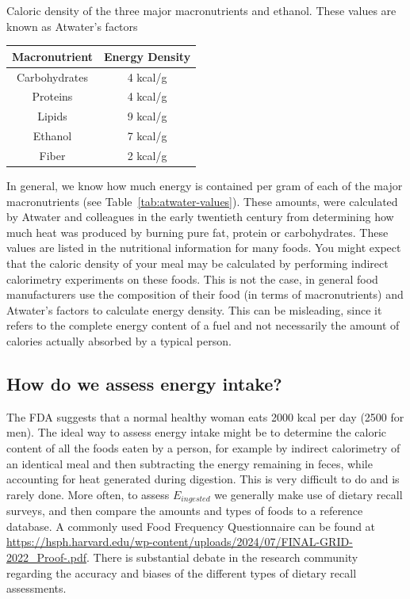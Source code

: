 \documentclass{tufte-handout}
\begin{document}
\begin{margintable}
\centering
\caption{Caloric density of the three major macronutrients and ethanol.  These values are known as Atwater's factors}\label{tab:atwater-values}
\begin{tabular}{cc}
\hline
\textbf{Macronutrient}       & \textbf{Energy Density}                     \\
\hline
Carbohydrates & 4 kcal/g \\
Proteins & 4 kcal/g \\
Lipids & 9 kcal/g \\
Ethanol & 7 kcal/g \\
Fiber & 2 kcal/g \\

\hline
\end{tabular}
\end{margintable}

In general, we know how much energy is contained per gram of each of the major macronutrients (see Table~\ref{tab:atwater-values}).  These amounts, were calculated by Atwater and colleagues in the early twentieth century from determining how much heat was produced by burning pure fat, protein or carbohydrates.  These values are listed in the nutritional information for many foods.  You might expect that the caloric density of your meal may be calculated by performing indirect calorimetry experiments on these foods.  This is not the case, in general food manufacturers use the composition of their food (in terms of macronutrients) and Atwater's factors to calculate energy density.  This can be misleading, since it refers to the complete energy content of a fuel and not necessarily the amount of calories actually absorbed by a typical person.  

\subsection{How do we assess energy intake?}

The FDA suggests that a normal healthy woman eats 2000 kcal per day (2500 for men).  The ideal way to assess energy intake might be to determine the caloric content of all the foods eaten by a person, for example by indirect calorimetry of an identical meal and then subtracting the energy remaining in feces, while accounting for heat generated during digestion.  This is very difficult to do and is rarely done.   More often, to assess $E_{ingested}$ we generally make use of dietary recall surveys, and then compare the amounts and types of foods to a reference database.  A commonly used Food Frequency Questionnaire can be found at \url{https://hsph.harvard.edu/wp-content/uploads/2024/07/FINAL-GRID-2022_Proof-.pdf}.  There is substantial debate in the research community regarding the accuracy and biases of the different types of dietary recall assessments.
\end{document}
